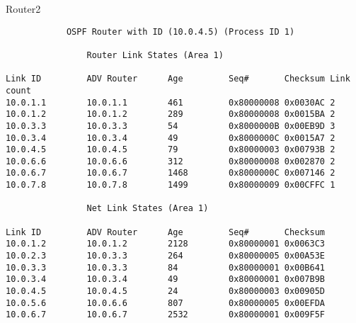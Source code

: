 Router2
\begin{lstlisting}
            OSPF Router with ID (10.0.4.5) (Process ID 1)

                Router Link States (Area 1)

Link ID         ADV Router      Age         Seq#       Checksum Link count
10.0.1.1        10.0.1.1        461         0x80000008 0x0030AC 2
10.0.1.2        10.0.1.2        289         0x80000008 0x0015BA 2
10.0.3.3        10.0.3.3        54          0x8000000B 0x00EB9D 3
10.0.3.4        10.0.3.4        49          0x8000000C 0x0015A7 2
10.0.4.5        10.0.4.5        79          0x80000003 0x00793B 2
10.0.6.6        10.0.6.6        312         0x80000008 0x002870 2
10.0.6.7        10.0.6.7        1468        0x8000000C 0x007146 2
10.0.7.8        10.0.7.8        1499        0x80000009 0x00CFFC 1

                Net Link States (Area 1)

Link ID         ADV Router      Age         Seq#       Checksum
10.0.1.2        10.0.1.2        2128        0x80000001 0x0063C3
10.0.2.3        10.0.3.3        264         0x80000005 0x00A53E
10.0.3.3        10.0.3.3        84          0x80000001 0x00B641
10.0.3.4        10.0.3.4        49          0x80000001 0x007B9B
10.0.4.5        10.0.4.5        24          0x80000003 0x00905D
10.0.5.6        10.0.6.6        807         0x80000005 0x00EFDA
10.0.6.7        10.0.6.7        2532        0x80000001 0x009F5F
\end{lstlisting}

